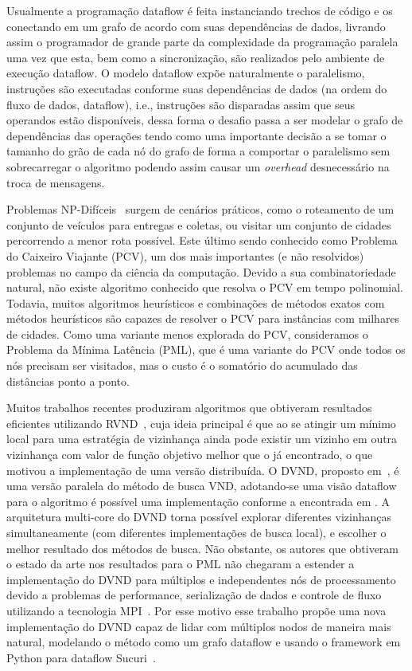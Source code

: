 Usualmente a programação dataflow é feita instanciando trechos de código e os conectando em um grafo de acordo com suas dependências de dados, livrando assim o programador de grande parte da complexidade da programação paralela uma vez que esta, bem como a sincronização, são realizados pelo ambiente de execução dataflow.
O modelo dataflow expõe naturalmente o paralelismo, instruções são executadas conforme suas dependências de dados (na ordem do fluxo de dados, dataflow), i.e., instruções são disparadas assim que seus operandos estão disponíveis, dessa forma o desafio passa a ser modelar o grafo de dependências das operações tendo como uma importante decisão a se tomar o tamanho do grão de cada nó do grafo de forma a comportar o paralelismo sem sobrecarregar o algoritmo podendo assim causar um \emph{overhead} desnecessário na troca de mensagens.

Problemas NP-Difíceis~\cite{GareyJohnson1990} surgem de cenários práticos, como o roteamento de um conjunto de veículos para entregas e coletas, ou visitar um conjunto de cidades percorrendo a menor rota possível.
Este último sendo conhecido como Problema do Caixeiro Viajante (PCV), um dos mais importantes (e não resolvidos) problemas no campo da ciência da computação.
Devido a sua combinatoriedade natural, não existe algoritmo conhecido que resolva o PCV em tempo polinomial.
Todavia, muitos algoritmos heurísticos e combinações de métodos exatos com métodos heurísticos são capazes de resolver o PCV para instâncias com milhares de cidades.
Como uma variante menos explorada do PCV, consideramos o Problema da Mínima Latência (PML), que é uma variante do PCV onde todos os nós precisam ser visitados, mas o custo é o somatório do acumulado das distâncias ponto a ponto.

Muitos trabalhos recentes produziram algoritmos que obtiveram resultados eficientes utilizando RVND~\cite{souza2010, silva2012,subramanian2013}, cuja ideia principal é que ao se atingir um mínimo local para uma estratégia de vizinhança ainda pode existir um vizinho em outra vizinhança com valor de função objetivo melhor que o já encontrado, o que motivou a implementação de uma versão distribuída.
O DVND, proposto em~\cite{RIOS201839}, é uma versão paralela do método de busca VND, adotando-se uma visão dataflow para o algoritmo é possível uma implementação conforme a encontrada em \cite{df-dvnd2018}.
A arquitetura multi-core do DVND torna possível explorar diferentes vizinhanças simultaneamente (com diferentes implementações de busca local), e escolher o melhor resultado dos métodos de busca.
Não obstante, os autores que obtiveram o estado da arte nos resultados para o PML não chegaram a estender a implementação do DVND para múltiplos e independentes nós de processamento devido a problemas de performance, serialização de dados e controle de fluxo utilizando a tecnologia MPI~\cite{jpdc2017}.
Por esse motivo esse trabalho propõe uma nova implementação do DVND capaz de lidar com múltiplos nodos de maneira mais natural, modelando o método como um grafo dataflow e usando o framework em Python para dataflow Sucuri~\cite{sucuri-original}.

